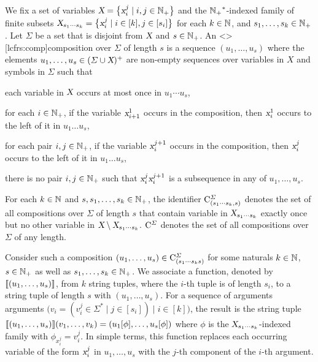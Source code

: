 \documentclass[../../document.tex]{subfiles}
\begin{document}
    \begin{definition}[Compositions]\label{def:lcfrs:comp}
        We fix a set of variables \(\textsl{X} = \big\{ \textsl{x}_i^j \mid i, j \in \mathbb{N}_+ \big\}\) and the \({\mathbb{N}_+}^*\)-indexed family of finite subsets \(\textsl{X}_{s_1\cdots s_k} = \big\{ \textsl{x}_i^j \mid i \in [k], j \in [s_i] \big\}\) for each \(k \in \mathbb{N}\), and \(s_1, \ldots, s_k \in \mathbb{N}_+\).
        Let \(\varSigma\) be a set that is disjoint from \(\textsl{X}\) and \(s \in \mathbb{N}_+\).
        An  <\lcfrs>[lcfrs:comp]{composition} over \(\varSigma\) of length \(s\) is a sequence \((u_1, \ldots, u_s)\) where the elements \(u_1, \dots, u_s \in (\varSigma \cup \textsl{X})^+\) are non-empty sequences over variables in \(X\) and symbols in \(\varSigma\) such that
        \begin{compactenum}
            \item each variable in \(\textsl{X}\) occurs at most once in \(u_1 \cdots u_s\),
            \item for each \(i \in \mathbb{N}_+\), if the variable \(\textsl{x}_{i+1}^1\) occurs in the composition, then \(\textsl{x}_i^1\) occurs to the left of it in \(u_1 \ldots u_s\),
            \item for each pair \(i, j \in \mathbb{N}_+\), if the variable \(\textsl{x}_i^{j+1}\) occurs in the composition, then \(\textsl{x}_i^j\) occurs to the left of it in \(u_1 \ldots u_s\),
            \item there is no pair \(i, j \in \mathbb{N}_+\) such that \(\textsl{x}^j_i\textsl{x}^{j+1}_i\) is a subsequence in any of \(u_1, \ldots, u_s\).
        \end{compactenum}
        For each \(k\in \mathbb{N}\) and \(s, s_1, \ldots, s_k \in \mathbb{N}_+\), the identifier \(\mathrm{C}^\varSigma_{(s_1\cdots s_k, s)}\) denotes the set of all  compositions over \(\varSigma\) of length \(s\) that contain variable in \(\textsl{X}_{s_1 \cdots s_k}\) exactly once but no other variable in \(\textsl{X} \setminus \textsl{X}_{s_1\cdots s_k}\).
        \(\mathrm{C}^\varSigma\) denotes the set of all  compositions over \(\varSigma\) of any length.

        Consider such a composition \((u_1, \ldots, u_s) \in \mathrm{C}^\varSigma_{(s_1\cdots s_k s)}\) for some naturals \(k \in \mathbb{N}\), \(s\in \mathbb{N}_+\) as well as \(s_1, \ldots, s_k \in \mathbb{N}_+\).
        We associate a function, denoted by \(\llbracket(u_1, \ldots, u_s)\rrbracket\), from \(k\) string tuples, where the \(i\)-th tuple is of length \(s_i\), to a string tuple of length \(s\) with \((u_1, \ldots, u_s)\).
        For a sequence of arguments arguments \(\big(v_i = (v_i^j \in \varSigma^* \mid j \in [s_i]) \mid i \in [k]\big)\), the result is the string tuple \(
        \llbracket(u_1, \ldots, u_s)\rrbracket(v_1, \ldots, v_k) = (u_1[\phi], \ldots, u_s[\phi])
        \) where \(\phi\) is the \(\textsl{X}_{s_1 \cdots s_k}\)-indexed family with \(\phi_{x_i^j} = v_i^j\).
        In simple terms, this function replaces each occurring variable of the form \(\textsl{x}_i^j\) in \(u_1, \ldots, u_s\) with the \(j\)-th component of the \(i\)-th argument.
    \end{definition}
\end{document}
